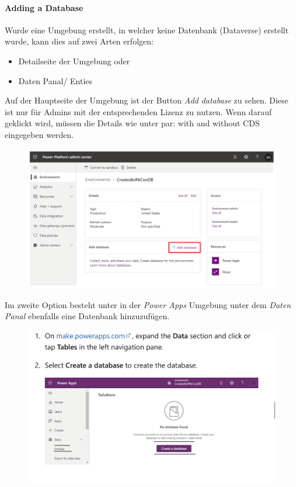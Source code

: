 \paragraph*{Adding a Database}
Wurde eine Umgebung erstellt, in welcher keine Datenbank (Dataverse) erstellt wurde, kann dies auf zwei Arten erfolgen:
\begin{itemize}
	\item Detailseite der Umgebung oder
	\item Daten Panal/ Enties	
\end{itemize}
Auf der Hauptseite der Umgebung ist der Button \textit{Add database} zu sehen. Diese ist nur für Admins mit der entsprechenden Lizenz zu nutzen. Wenn darauf geklickt wird, müssen die Details wie unter \refname{par: \Env with and without CDS} eingegeben werden. 

\begin{figure}[H]
	\centering
	\includegraphics[scale = 0.3]{attachment/chapter_13/Scc024}
\end{figure}

Im zweite Option besteht unter in der \textit{Power Apps} Umgebung unter dem \textit{Daten Panal} ebenfalls eine Datenbank hinzuzufügen. 

\begin{figure}[H]
	\centering
	\includegraphics[scale = 0.3]{attachment/chapter_13/Scc025}
\end{figure}

